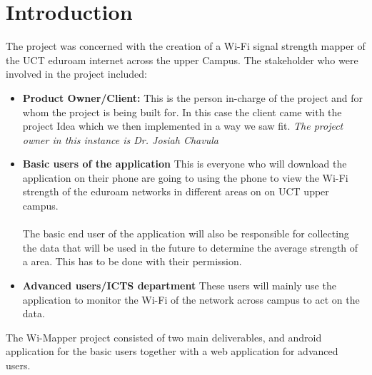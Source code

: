 \section{Introduction}
\label{ss:introduction}
The project was concerned with the creation of a Wi-Fi signal strength mapper of the UCT eduroam internet across the upper Campus.
The stakeholder who were involved in the project included:
\begin{itemize}
	\item \textbf{Product Owner/Client:} This is the person in-charge of the project and for whom the project is being built for. In this case the client came with the project Idea which we then implemented in a way we saw fit. \textit{The project owner in this instance is Dr. Josiah Chavula}
	\item \textbf{Basic users of the application} This is everyone who will download the application on their phone are going to using the phone to view the Wi-Fi strength of the eduroam networks in different areas on on UCT upper campus. 
	\paragraph{}The basic end user of the application will also be responsible for collecting the data that will be used in the future to determine the average strength of a area. This has to be done with their permission.
	\item \textbf{Advanced users/ICTS department} These users will mainly use the application to monitor the Wi-Fi of the network across campus to act on the data.
\end{itemize} The Wi-Mapper project consisted of two main deliverables, and android application for the basic users together with a web application for advanced users.
